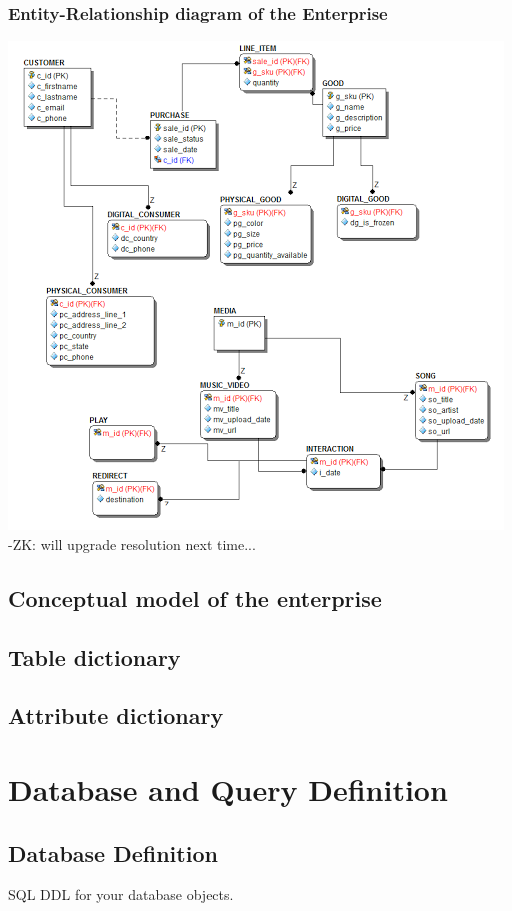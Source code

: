\documentclass[11pt, a4paper]{report}
\begin{document}
\clearpage
\subsection{Entity-Relationship diagram of the Enterprise}
\includegraphics[]{ERB.png}
-ZK: will upgrade resolution next time...

\clearpage
\section{Conceptual model of the enterprise}

\section{Table dictionary}
\section{Attribute dictionary}

\chapter{Database and Query Definition}

\section{Database Definition}
    SQL DDL for your database objects.
\end{document}
